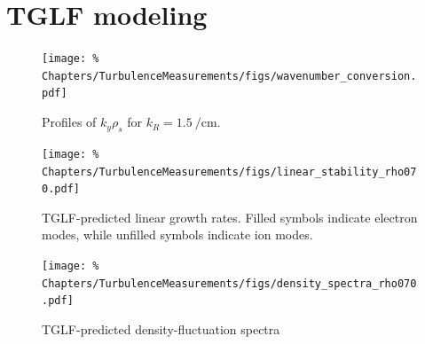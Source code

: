\section{TGLF modeling}
\begin{figure}[h!]
  \centering
  \texttt{[image: \%
    Chapters/TurbulenceMeasurements/figs/wavenumber\_conversion.pdf]}
  \caption[Profiles of $k_y \rho_s$ for $k_R = \SI{1.5}{\per\centi\meter}$]{%
    Profiles of $k_y \rho_s$ for $k_R = \SI{1.5}{\per\centi\meter}$.
  }
\label{fig:TurbulenceMeasurements:wavenumber_conversion}
\end{figure}

\begin{figure}[h!]
  \centering
  \texttt{[image: \%
    Chapters/TurbulenceMeasurements/figs/linear\_stability\_rho070.pdf]}
  \caption[TGLF-predicted linear growth rates]{%
    TGLF-predicted linear growth rates.
    Filled symbols indicate electron modes, while
    unfilled symbols indicate ion modes.
  }
\label{fig:TurbulenceMeasurements:linear_stability}
\end{figure}

\begin{figure}[h!]
  \centering
  \texttt{[image: \%
    Chapters/TurbulenceMeasurements/figs/density\_spectra\_rho070.pdf]}
  \caption[TGLF-predicted density-fluctuation spectra]{%
    TGLF-predicted density-fluctuation spectra
  }
\label{fig:TurbulenceMeasurements:density_spectra}
\end{figure}





